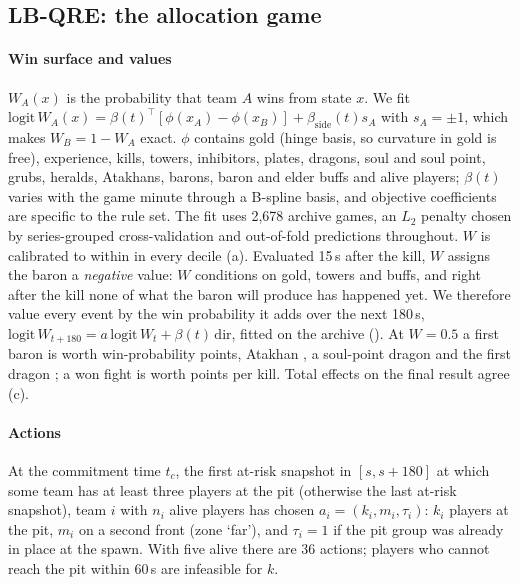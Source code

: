 \subsection{LB-QRE: the allocation game}

\paragraph*{Win surface and values}
$W_A(x)$ is the probability that team $A$ wins from state $x$. We fit $\mathrm{logit}\,W_A(x)=\beta(t)^\top[\phi(x_A)-\phi(x_B)]+\beta_{\mathrm{side}}(t)s_A$ with $s_A=\pm1$, which makes $W_B=1-W_A$ exact. $\phi$ contains gold (hinge basis, so curvature in gold is free), experience, kills, towers, inhibitors, plates, dragons, soul and soul point, grubs, heralds, Atakhans, barons, baron and elder buffs and alive players; $\beta(t)$ varies with the game minute through a B-spline basis, and objective coefficients are specific to the rule set. The fit uses 2,678 archive games, an $L_2$ penalty chosen by series-grouped cross-validation and out-of-fold predictions throughout.
$W$ is calibrated to within \pp{} in every decile (a).
Evaluated 15\,s after the kill, $W$ assigns the baron a \emph{negative} value: $W$ conditions on gold, towers and buffs, and right after the kill none of what the baron will produce has happened yet.
We therefore value every event by the win probability it adds over the next 180\,s, $\mathrm{logit}\,W_{t+180}=a\,\mathrm{logit}\,W_t+\beta(t)\,\mathrm{dir}$, fitted on the archive ().
At $W=0.5$ a first baron is worth  win-probability points, Atakhan , a soul-point dragon  and the first dragon ; a won fight is worth  points per kill.
Total effects on the final result agree (c).




\paragraph*{Actions}
At the commitment time $t_c$, the first at-risk snapshot in $[s,s{+}180]$ at which some team has at least three players at the pit (otherwise the last at-risk snapshot), team $i$ with $n_i$ alive players has chosen $a_i=(k_i,m_i,\tau_i)$: $k_i$ players at the pit, $m_i$ on a second front (zone `far'), and $\tau_i=1$ if the pit group was already in place at the spawn.
With five alive there are 36 actions; players who cannot reach the pit within 60\,s are infeasible for $k$.

